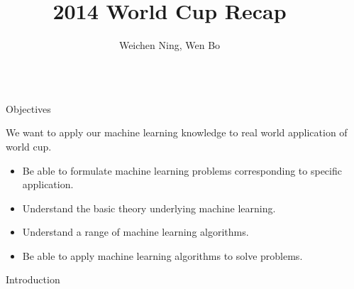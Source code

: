 \documentclass[final]{beamer}
\title{2014 World Cup Recap} %
\author{Weichen Ning, Wen Bo} %
\institute{Department of ECE, Duke University} %
\newlength{\sepwid}
\newlength{\onecolwid}
\begin{document}

\setlength{\belowcaptionskip}{2ex} %
\setlength\belowdisplayshortskip{2ex} %

\begin{frame}[t] %

\begin{columns}[t] %

\begin{column}{\sepwid}\end{column} %

\begin{column}{\onecolwid} %


\begin{alertblock}{Objectives}

We want to apply our machine learning knowledge to real world application of world cup.
\begin{itemize}
\item Be able to formulate machine learning problems corresponding to specific application.
\item Understand the basic theory underlying machine learning.
\item Understand a range of machine learning algorithms.
\item  Be able to apply machine learning algorithms to solve problems. 
\end{itemize}

\end{alertblock}


\begin{block}{Introduction}


\end{block}
\end{column}
\end{columns}
\end{frame}
\end{document}
